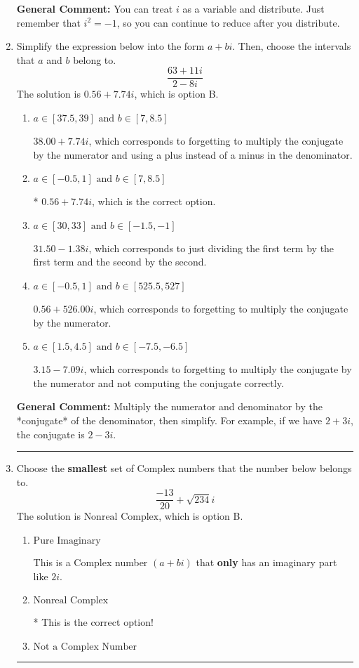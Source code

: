 \documentclass{extbook}[14pt]
\newcommand{\litem}[1]{\item #1

\rule{\textwidth}{0.4pt}}
\begin{document}
\begin{enumerate}
{\textbf{General Comment:} You can treat $i$ as a variable and distribute. Just remember that $i^2=-1$, so you can continue to reduce after you distribute.
}
\litem{
Simplify the expression below into the form $a+bi$. Then, choose the intervals that $a$ and $b$ belong to.
\[ \frac{63 + 11 i}{2 - 8 i} \]The solution is \( 0.56  + 7.74 i \), which is option B.\begin{enumerate}[label=\Alph*.]
\item \( a \in [37.5, 39] \text{ and } b \in [7, 8.5] \)

 $38.00  + 7.74 i$, which corresponds to forgetting to multiply the conjugate by the numerator and using a plus instead of a minus in the denominator.
\item \( a \in [-0.5, 1] \text{ and } b \in [7, 8.5] \)

* $0.56  + 7.74 i$, which is the correct option.
\item \( a \in [30, 33] \text{ and } b \in [-1.5, -1] \)

 $31.50  - 1.38 i$, which corresponds to just dividing the first term by the first term and the second by the second.
\item \( a \in [-0.5, 1] \text{ and } b \in [525.5, 527] \)

 $0.56  + 526.00 i$, which corresponds to forgetting to multiply the conjugate by the numerator.
\item \( a \in [1.5, 4.5] \text{ and } b \in [-7.5, -6.5] \)

 $3.15  - 7.09 i$, which corresponds to forgetting to multiply the conjugate by the numerator and not computing the conjugate correctly.
\end{enumerate}

\textbf{General Comment:} Multiply the numerator and denominator by the *conjugate* of the denominator, then simplify. For example, if we have $2+3i$, the conjugate is $2-3i$.
}
\litem{
Choose the \textbf{smallest} set of Complex numbers that the number below belongs to.
\[ \frac{-13}{20}+\sqrt{234} i \]The solution is \( \text{Nonreal Complex} \), which is option B.\begin{enumerate}[label=\Alph*.]
\item \( \text{Pure Imaginary} \)

This is a Complex number $(a+bi)$ that \textbf{only} has an imaginary part like $2i$.
\item \( \text{Nonreal Complex} \)

* This is the correct option!
\item \( \text{Not a Complex Number} \)


\end{enumerate}}
\end{enumerate}
\end{document}

